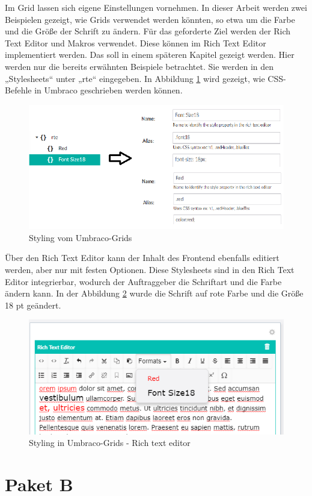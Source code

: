 Im Grid lassen sich eigene Einstellungen vornehmen. In dieser Arbeit werden zwei Beispielen gezeigt, wie Grids verwendet werden könnten, so etwa um die Farbe und die Größe der Schrift zu ändern. Für das geforderte Ziel werden der Rich Text Editor und Makros verwendet. Diese können im Rich Text Editor implementiert werden. Das soll in einem späteren Kapitel gezeigt werden. Hier werden nur die bereits erwähnten Beispiele betrachtet. Sie werden in den „Stylesheets“ unter „rte“ eingegeben. In Abbildung  \ref{fig:StylingGrind} wird gezeigt, wie CSS-Befehle in Umbraco geschrieben werden können.
     
     \begin{figure}[h]
     	\centering
     	\includegraphics[width=0.6\linewidth]{Graphics/StylingGrind.png}
     	\caption[StylingGrind]{Styling vom Umbraco-Grids}
     	\label{fig:StylingGrind}
     \end{figure}
     
Über den Rich Text Editor kann der Inhalt des Frontend ebenfalls editiert werden, aber nur mit festen Optionen. Diese Stylesheets sind in den Rich Text Editor integrierbar, wodurch der Auftraggeber die Schriftart und die Farbe ändern kann. In der Abbildung  \ref{fig:schriftManip} wurde die Schrift auf rote Farbe und die Größe 18 pt geändert.

 \begin{figure}[h]
	\centering
	\includegraphics[width=0.6\linewidth]{Graphics/schriftManip.png}
	\caption[StylingGrind]{Styling in Umbraco-Grids - Rich text editor}
	\label{fig:schriftManip}
\end{figure}

\section{Paket B}

